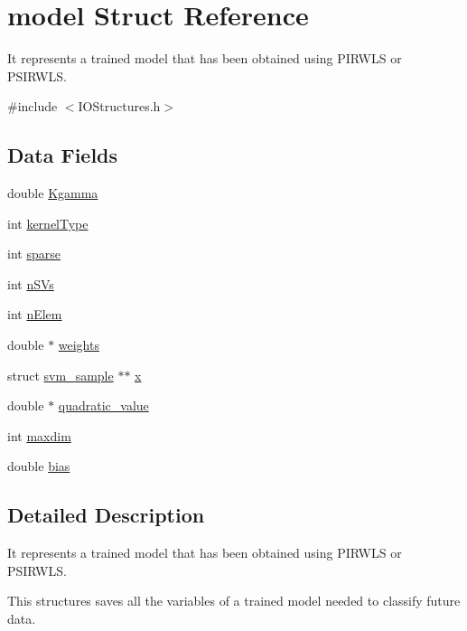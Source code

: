 \hypertarget{structmodel}{}\section{model Struct Reference}
\label{structmodel}


It represents a trained model that has been obtained using P\+I\+R\+W\+LS or P\+S\+I\+R\+W\+LS.  




{\ttfamily \#include $<$I\+O\+Structures.\+h$>$}

\subsection*{Data Fields}
\begin{DoxyCompactItemize}
\item 
double \hyperlink{structmodel_ac5c18eca6ad32bc6da1f2a923965e66c}{Kgamma}
\item 
int \hyperlink{structmodel_aaff8ca8579bd888fcfeca1c682618be9}{kernel\+Type}
\item 
int \hyperlink{structmodel_ad00b5b9bbafcd18eb6367c90d9471231}{sparse}
\item 
int \hyperlink{structmodel_a3b73d79940bbdae365676c4fa56e96ea}{n\+S\+Vs}
\item 
int \hyperlink{structmodel_a4877089d41daf2186482e0e6f900d65f}{n\+Elem}
\item 
double $\ast$ \hyperlink{structmodel_a658dab89d4b4b1a5bd28cdfb4abafe39}{weights}
\item 
struct \hyperlink{structsvm__sample}{svm\+\_\+sample} $\ast$$\ast$ \hyperlink{structmodel_a81da41c8731f95de344a068d302eb336}{x}
\item 
double $\ast$ \hyperlink{structmodel_a623da3d1f5116fd4d66873b95eb2e720}{quadratic\+\_\+value}
\item 
int \hyperlink{structmodel_ac6ba8c1bc138143114cd331583f41387}{maxdim}
\item 
double \hyperlink{structmodel_a9aef7cc709fca4e03a021623ce6c7ae6}{bias}
\end{DoxyCompactItemize}


\subsection{Detailed Description}
It represents a trained model that has been obtained using P\+I\+R\+W\+LS or P\+S\+I\+R\+W\+LS. 

This structures saves all the variables of a trained model needed to classify future data. 

